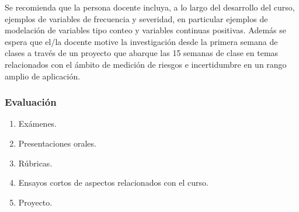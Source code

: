 \begin{refsection}
Se recomienda que la persona docente incluya, a lo largo del desarrollo del curso, ejemplos de variables de frecuencia y severidad, en particular ejemplos de modelación de variables tipo conteo y variables continuas positivas. Además se espera que el/la docente motive la investigación desde la primera semana de clases a través de un proyecto que abarque las 15 semanas de clase en temas relacionados con el ámbito de medición de riesgos e incertidumbre en un rango amplio de aplicación.

\subsubsection*{Evaluación}

\begin{enumerate}
\item Exámenes.
\item Presentaciones orales.
\item Rúbricas.
\item Ensayos cortos de aspectos relacionados con el curso.
\item Proyecto.
\end{enumerate}

\nocite{BD00}
\nocite{CB01}
\nocite{DS12}
\nocite{ER10}
\nocite{HMC13}
\nocite{HTZ15}
\nocite{Ric07}
\nocite{Rob07}
\nocite{Was03}
\nocite{WG17}

\printcursosbibliography

\end{refsection}
